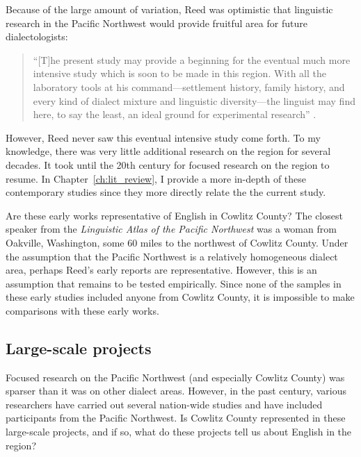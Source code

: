 Because of the large amount of variation, Reed was optimistic that linguistic research in the Pacific Northwest would provide fruitful area for future dialectologists:
\begin{quote}
    ``[T]he present study may provide a beginning for the eventual much more intensive study which is soon to be made in this region. With all the laboratory tools at his command---settlement history, family history, and every kind of dialect mixture and linguistic diversity---the linguist may find here, to say the least, an ideal ground for experimental research'' \citeyearpar[Reed][189]{reed_1952}.
\end{quote}
However, Reed never saw this eventual intensive study come forth. To my knowledge, there was very little additional research on the region for several decades. It took until the 20th century for focused research on the region to resume. In Chapter~\ref{ch:lit_review}, I provide a more in-depth of these contemporary studies since they more directly relate the the current study.

Are these early works representative of English in Cowlitz County? The closest speaker from the \textit{Linguistic Atlas of the Pacific Northwest} was a woman from Oakville, Washington, some 60 miles to the northwest of Cowlitz County. Under the assumption that the Pacific Northwest is a relatively homogeneous dialect area, perhaps Reed's early reports are representative. However, this is an assumption that remains to be tested empirically. Since none of the samples in these early studies included anyone from Cowlitz County, it is impossible to make comparisons with these early works.

\subsection{Large-scale projects}

Focused research on the Pacific Northwest (and especially Cowlitz County) was sparser than it was on other dialect areas. However, in the past century, various researchers have carried out several nation-wide studies and have included participants from the Pacific Northwest. Is Cowlitz County represented in these large-scale projects, and if so, what do these projects tell us about English in the region?

